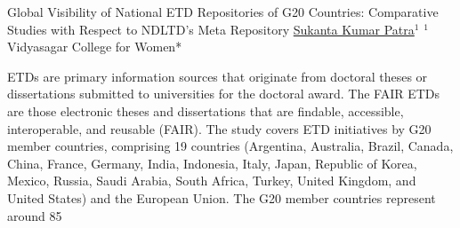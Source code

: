 \begin{abstract_online}{Global Visibility of National ETD Repositories of G20 Countries: Comparative Studies with Respect to NDLTD’s Meta Repository}{%
    \underline{Sukanta Kumar Patra}$^{1}$}{%
    }{%
    $^1$Vidyasagar College for Women*\newline{}
}

ETDs are primary information sources that originate from doctoral theses or dissertations submitted to universities for the doctoral award. The FAIR ETDs are those electronic theses and dissertations that are findable, accessible, interoperable, and reusable (FAIR). The study covers ETD initiatives by G20 member countries, comprising 19 countries (Argentina, Australia, Brazil, Canada, China, France, Germany, India, Indonesia, Italy, Japan, Republic of Korea, Mexico, Russia, Saudi Arabia, South Africa, Turkey, United Kingdom, and United States) and the European Union. The G20 member countries represent around 85%

\end{abstract_online}

